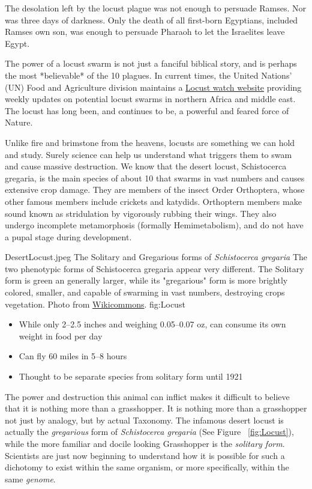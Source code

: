 The desolation left by the locust plague was not enough to persuade Ramses. Nor was three days of darkness. Only the death of all first-born Egyptians, included Ramses own son, was enough to persuade Pharaoh to let the Israelites leave Egypt.

The power of a locust swarm is not just a fanciful biblical story, and is perhaps the most *believable* of the 10 plagues. In current times, the United Nations' (UN) Food and Agriculture division maintains a \href{http://www.fao.org/ag/locusts/en/info/info/news/index.html}{Locust watch website} providing weekly updates on potential locust swarms in northern Africa and middle east. The locust has long been, and continues to be, a powerful and feared force of Nature.

Unlike fire and brimstone from the heavens, locusts are something we can hold and study. Surely science can help us understand what triggers them to swam and cause massive destruction. We know that the desert locust, Schistocerca gregaria, is the main species of about 10 that swarms in vast numbers and causes extensive crop damage. They are members of the insect Order Orthoptera, whose other famous members include crickets and katydids. Orthoptern members make sound known as stridulation by vigorously rubbing their wings. They also undergo incomplete metamorphosis (formally Hemimetabolism), and do not have a pupal stage during development. 

\InsertFigure
{DesertLocust.jpeg}
	{The Solitary and Gregarious forms of \textit{Schistocerca gregaria}}
	{
		The two phenotypic forms of Schistocerca gregaria appear very different.  The Solitary form is green an generally larger, while its "gregarious" form is more brightly colored, smaller, and capable of swarming in vast numbers, destroying crops vegetation. Photo from \href{http://www.wikicommons.com}{Wikicommons}.
	}
	{fig:Locust}

\begin{itemize}
  \item While only 2–2.5 inches and weighing 0.05–0.07 oz, can consume its own weight in food per day
  \item Can fly 60 miles in 5–8 hours
  \item Thought to be separate species from solitary form until 1921 
\end{itemize}

The power and destruction this animal can inflict makes it difficult to believe that it is nothing more than a grasshopper. It is nothing more than a grasshopper not just by analogy, but by actual Taxonomy. The infamous desert locust is actually the \textit{gregarious} form  of \textit{Schistocerca gregaria} (See Figure ~\ref{fig:Locust}), while the more familiar and docile looking Grasshopper is the \textit{solitary form}. Scientists are just now beginning to understand how it is possible for such a dichotomy to exist within the same organism, or more specifically, within the same \textit{genome}.


